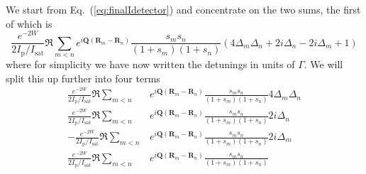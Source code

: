 \documentclass[11pt,letter]{article}
\newcommand{\bv}[1]{\ensuremath{\bm{#1}}}
\begin{document}
We start from Eq.~(\ref{eq:finalIdetector}) and concentrate on the two sums,
the first of which is 
\begin{equation} 
  \frac{  e^{-2W}}{2I_{\mathrm{p}}/I_{\mathrm{sat}}} \Re 
  \sum_{m<n} 
               e^{ i \bv{Q}( \bv{R}_{m} - \bv{R}_{n} ) } 
    \frac{ s_{m} s_{n} } {( 1+s_{m} )( 1+s_{n} ) }
    \left(
         4\Delta_{m} \Delta_{n} 
      + 2i \Delta_{n} 
      - 2i \Delta_{m}
      + 1
    \right)  
\end{equation}
where for simplicity we have now written the detunings in units of $\Gamma$.  We will split this up further into four terms 
\begin{align} 
  \frac{  e^{-2W}}{2I_{\mathrm{p}}/I_{\mathrm{sat}}} \Re \sum_{m<n} & 
      e^{ i \bv{Q}( \bv{R}_{m} - \bv{R}_{n} ) } 
      \frac{ s_{m} s_{n} } {( 1+s_{m} )( 1+s_{n} ) } 4 \Delta_{m} \Delta_{n} \\
  \frac{  e^{-2W}}{2I_{\mathrm{p}}/I_{\mathrm{sat}}} \Re \sum_{m<n} & 
      e^{ i \bv{Q}( \bv{R}_{m} - \bv{R}_{n} ) } 
      \frac{ s_{m} s_{n} } {( 1+s_{m} )( 1+s_{n} ) } 2 i \Delta_{n}  \\
  -\frac{  e^{-2W}}{2I_{\mathrm{p}}/I_{\mathrm{sat}}} \Re \sum_{m<n} & 
      e^{ i \bv{Q}( \bv{R}_{m} - \bv{R}_{n} ) } 
      \frac{ s_{m} s_{n} } {( 1+s_{m} )( 1+s_{n} ) } 2 i \Delta_{m}  \\
  \frac{  e^{-2W}}{2I_{\mathrm{p}}/I_{\mathrm{sat}}} \Re \sum_{m<n} & 
      e^{ i \bv{Q}( \bv{R}_{m} - \bv{R}_{n} ) } 
      \frac{ s_{m} s_{n} } {( 1+s_{m} )( 1+s_{n} ) }   
\end{align}
\end{document}
